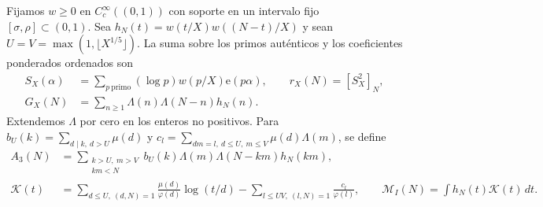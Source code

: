 \documentclass[11pt,a4paper]{article}
\newcommand{\B}[2]{#2}
\newcommand{\B}[2]{#1}
\newcommand{\e}{\mathrm e}
\begin{document}
\B{Fix a nonnegative $w\in C_c^\infty((0,1))$ with support in a fixed $[\sigma,\rho]\subset(0,1)$. Put $h_N(t)=w(t/X)w((N-t)/X)$ and set $U=V=\max(1,\lfloor X^{1/5}\rfloor)$. The actual prime sum and the ordered weighted coefficients are}{Fijamos $w\ge0$ en $C_c^\infty((0,1))$ con soporte en un intervalo fijo $[\sigma,\rho]\subset(0,1)$. Sea $h_N(t)=w(t/X)w((N-t)/X)$ y sean $U=V=\max(1,\lfloor X^{1/5}\rfloor)$. La suma sobre los primos auténticos y los coeficientes ponderados ordenados son}
\begin{align*}
 S_X(\alpha)&=\sum_{p\ \B{\mathrm{prime}}{\mathrm{primo}}}(\log p)w(p/X)\e(p\alpha),\qquad r_X(N)=[S_X^2]_N,\\
 G_X(N)&=\sum_{n\ge1}\Lambda(n)\Lambda(N-n)h_N(n).
\end{align*}
\B{Extend $\Lambda$ by zero on nonpositive integers. Write $b_U(k)=\sum_{d\mid k,\ d>U}\mu(d)$ and let $c_l=\sum_{dm=l,\ d\le U,\ m\le V}\mu(d)\Lambda(m)$, define}{Extendemos $\Lambda$ por cero en los enteros no positivos. Para $b_U(k)=\sum_{d\mid k,\ d>U}\mu(d)$ y $c_l=\sum_{dm=l,\ d\le U,\ m\le V}\mu(d)\Lambda(m)$, se define}
\begin{align*}
 A_3(N)&=\sum_{\substack{k>U,\ m>V\\km<N}} b_U(k)\Lambda(m)\Lambda(N-km)h_N(km),\\
 \mathcal K(t)&=\sum_{d\le U,\ (d,N)=1}\frac{\mu(d)}{\varphi(d)}\log(t/d)
       -\sum_{l\le UV,\ (l,N)=1}\frac{c_l}{\varphi(l)},\qquad
 \mathcal M_I(N)=\int h_N(t)\mathcal K(t)\,dt .
\end{align*}
\end{document}
